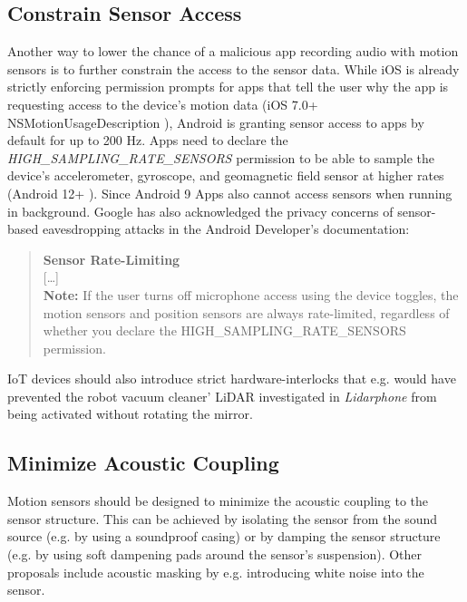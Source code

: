 \documentclass[sigconf, nonacm]{acmart}
\begin{document}
\subsection{Constrain Sensor Access}
Another way to lower the chance of a malicious app recording audio with motion sensors is to further constrain the access to the sensor data.
While iOS is already strictly enforcing permission prompts for apps that tell the user why the app is requesting access to the device's motion data (iOS 7.0+ NSMotionUsageDescription \cite{AppleDeveloperMotionUsageDescription}), Android is granting sensor access to apps by default for up to 200 Hz. Apps need to declare the \textit{HIGH\_SAMPLING\_RATE\_SENSORS} permission to be able to sample the device's accelerometer, gyroscope, and geomagnetic field sensor at higher rates (Android 12+ \cite{AndroidDeveloperSensorDocs}).
Since Android 9 Apps also cannot access sensors when running in background.
Google has also acknowledged the privacy concerns of sensor-based eavesdropping attacks in the Android Developer's documentation:
\begin{quote}
  \vspace{0.1cm}
  \textbf{Sensor Rate-Limiting} \\
  {[\ldots]} \\
  \textbf{Note:} If the user turns off microphone access using the device toggles, the motion sensors and position sensors are always rate-limited, regardless of whether you declare the HIGH\_SAMPLING\_RATE\_SENSORS permission.
\end{quote}

\noindent
IoT devices should also introduce strict hardware-interlocks that e.g. would have prevented the robot vacuum cleaner' LiDAR investigated in \textit{Lidarphone} \cite{LidarPhone2020} from being activated without rotating the mirror.

\subsection{Minimize Acoustic Coupling}
Motion sensors should be designed to minimize the acoustic coupling to the sensor structure.
This can be achieved by isolating the sensor from the sound source (e.g. by using a soundproof casing) or by damping the sensor structure (e.g. by using soft dampening pads around the sensor's suspension).
Other proposals include acoustic masking by e.g. introducing white noise into the sensor.
\end{document}
